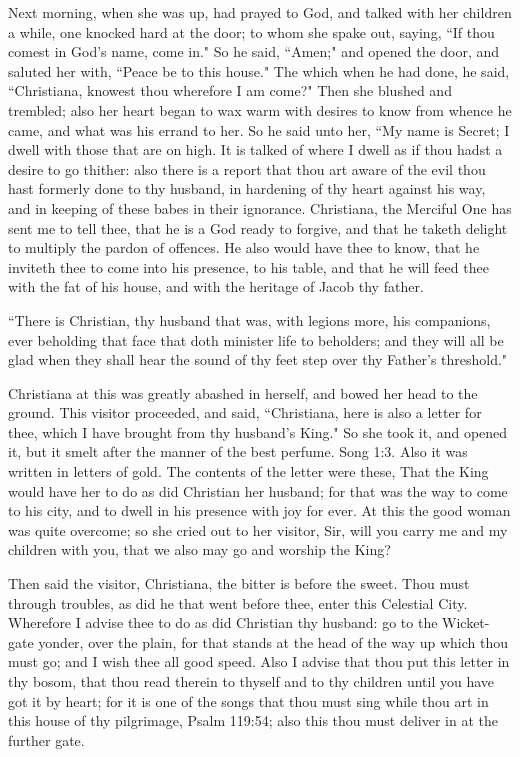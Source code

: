 Next morning, when she was up, had prayed to God, and talked with her children a while, one knocked hard at the door; to whom she spake out, saying, ``If thou comest in God's name, come in." So he said, ``Amen;" and opened the door, and saluted her with, ``Peace be to this house." The which when he had done, he said, ``Christiana, knowest thou wherefore I am come?" Then she blushed and trembled; also her heart began to wax warm with desires to know from whence he came, and what was his errand to her. So he said unto her, ``My name is Secret; I dwell with those that are on high. It is talked of where I dwell as if thou hadst a desire to go thither: also there is a report that thou art aware of the evil thou hast formerly done to thy husband, in hardening of thy heart against his way, and in keeping of these babes in their ignorance. Christiana, the Merciful One has sent me to tell thee, that he is a God ready to forgive, and that he taketh delight to multiply the pardon of offences. He also would have thee to know, that he inviteth thee to come into his presence, to his table, and that he will feed thee with the fat of his house, and with the heritage of Jacob thy father.

``There is Christian, thy husband that was, with legions more, his companions, ever beholding that face that doth minister life to beholders; and they will all be glad when they shall hear the sound of thy feet step over thy Father's threshold."

Christiana at this was greatly abashed in herself, and bowed her head to the ground. This visitor proceeded, and said, ``Christiana, here is also a letter for thee, which I have brought from thy husband's King." So she took it, and opened it, but it smelt after the manner of the best perfume. Song 1:3. Also it was written in letters of gold. The contents of the letter were these, That the King would have her to do as did Christian her husband; for that was the way to come to his city, and to dwell in his presence with joy for ever. At this the good woman was quite overcome; so she cried out to her visitor, Sir, will you carry me and my children with you, that we also may go and worship the King?

Then said the visitor, Christiana, the bitter is before the sweet. Thou must through troubles, as did he that went before thee, enter this Celestial City. Wherefore I advise thee to do as did Christian thy husband: go to the Wicket-gate yonder, over the plain, for that stands at the head of the way up which thou must go; and I wish thee all good speed. Also I advise that thou put this letter in thy bosom, that thou read therein to thyself and to thy children until you have got it by heart; for it is one of the songs that thou must sing while thou art in this house of thy pilgrimage, Psalm 119:54; also this thou must deliver in at the further gate.

